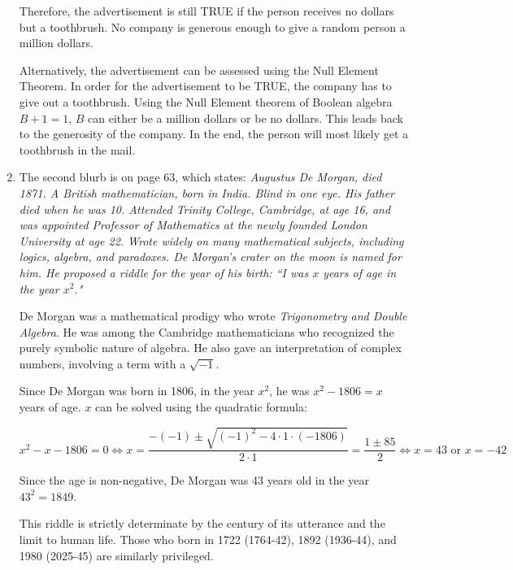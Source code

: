 \documentclass[12pt]{article}
\begin{document}
\begin{enumerate}
  Therefore, the advertisement is still TRUE if the person receives no dollars but a toothbrush. No company is generous enough to give a random person a million dollars.

  Alternatively, the advertisement can be assessed using the Null Element Theorem. In order for the advertisement to be TRUE, the company has to give out a toothbrush. Using the Null Element theorem of Boolean algebra $B + 1 = 1$, $B$ can either be a million dollars or be no dollars. This leads back to the generosity of the company. In the end, the person will most likely get a toothbrush in the mail.

  \item The second blurb is on page 63, which states: \textit{Augustus De Morgan, died 1871. A British mathematician, born in India. Blind in one eye. His father died when he was 10. Attended Trinity College, Cambridge, at age 16, and was appointed Professor of Mathematics at the newly founded London University at age 22. Wrote widely on many mathematical subjects, including logics, algebra, and paradoxes. De Morgan's crater on the moon is named for him. He proposed a riddle for the year of his birth: ``I was $x$ years of age in the year $x^2$."}

  De Morgan was a mathematical prodigy who wrote \textit{Trigonometry and Double Algebra}. He was among the Cambridge mathematicians who recognized the purely symbolic nature of algebra. He also gave an interpretation of complex numbers, involving a term with a $\sqrt{-1}$.\cite{WikipediaDeMorgan}

  Since De Morgan was born in 1806, in the year $x^2$, he was $x^2 - 1806 = x$ years of age. $x$ can be solved using the quadratic formula:

  \begin{equation} \label{equation:8}
    x^2 - x - 1806 = 0
    \Leftrightarrow x = \frac{-(-1) \pm \sqrt{(-1)^2 - 4 \cdot 1 \cdot (-1806)}}{2 \cdot 1} = \frac{1 \pm 85}{2}
    \Leftrightarrow x = 43\text{ or }x = -42
  \end{equation}

  Since the age is non-negative, De Morgan was 43 years old in the year $43^2 = 1849$.

  This riddle is strictly determinate by the century of its utterance and the limit to human life. Those who born in 1722 (1764-42), 1892 (1936-44), and 1980 (2025-45) are similarly privileged.\cite{WikipediaDeMorgan}
\end{enumerate}
\end{document}
